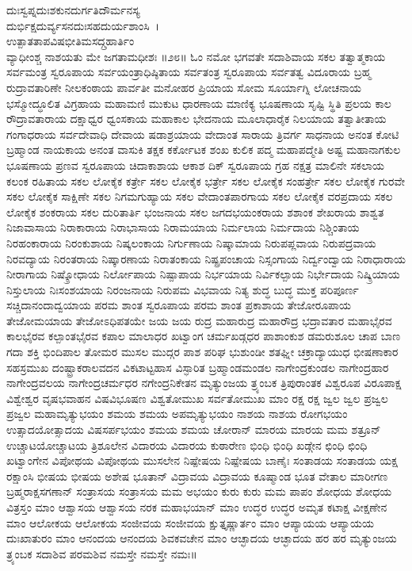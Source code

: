 ದುಃಸ್ವಪ್ನದುಃಶಕುನದುರ್ಗತಿದೌರ್ಮನಸ್ಯ\\ದುರ್ಭಿಕ್ಷದುರ್ವ್ಯಸನದುಃಸಹದುರ್ಯಶಾಂಸಿ~।\\
ಉತ್ಪಾತತಾಪವಿಷಭೀತಿಮಸದ್ಗ್ರಹಾರ್ತಿಂ\\ವ್ಯಾಧೀಂಶ್ಚ ನಾಶಯತು ಮೇ ಜಗತಾಮಧೀಶಃ ॥೨೮॥
\newpage
ಓಂ ನಮೋ ಭಗವತೇ ಸದಾಶಿವಾಯ ಸಕಲ ತತ್ವಾತ್ಮಕಾಯ ಸರ್ವಮಂತ್ರ ಸ್ವರೂಪಾಯ ಸರ್ವಯಂತ್ರಾಧಿಷ್ಠಿತಾಯ ಸರ್ವತಂತ್ರ ಸ್ವರೂಪಾಯ ಸರ್ವತತ್ವ ವಿದೂರಾಯ ಬ್ರಹ್ಮ ರುದ್ರಾವತಾರಿಣೇ ನೀಲಕಂಠಾಯ ಪಾರ್ವತೀ ಮನೋಹರ ಪ್ರಿಯಾಯ ಸೋಮ ಸೂರ್ಯಾಗ್ನಿ ಲೋಚನಾಯ ಭಸ್ಮೋದ್ಧೂಲಿತ ವಿಗ್ರಹಾಯ ಮಹಾಮಣಿ ಮುಕುಟ ಧಾರಣಾಯ ಮಾಣಿಕ್ಯ ಭೂಷಣಾಯ ಸೃಷ್ಟಿ ಸ್ಥಿತಿ ಪ್ರಲಯ ಕಾಲ ರೌದ್ರಾವತಾರಾಯ ದಕ್ಷಾಧ್ವರ ಧ್ವಂಸಕಾಯ ಮಹಾಕಾಲ ಭೇದನಾಯ ಮೂಲಾಧಾರೈಕ ನಿಲಯಾಯ ತತ್ವಾತೀತಾಯ ಗಂಗಾಧರಾಯ ಸರ್ವದೇವಾಧಿ ದೇವಾಯ ಷಡಾಶ್ರಯಾಯ ವೇದಾಂತ ಸಾರಾಯ ತ್ರಿವರ್ಗ ಸಾಧನಾಯ ಅನಂತ ಕೋಟಿ ಬ್ರಹ್ಮಾಂಡ ನಾಯಕಾಯ ಅನಂತ ವಾಸುಕಿ ತಕ್ಷಕ ಕರ್ಕೋಟಕ ಶಂಖ ಕುಲಿಕ ಪದ್ಮ ಮಹಾಪದ್ಮೇತಿ ಅಷ್ಟ ಮಹಾನಾಗಕುಲ ಭೂಷಣಾಯ ಪ್ರಣವ ಸ್ವರೂಪಾಯ ಚಿದಾಕಾಶಾಯ ಆಕಾಶ ದಿಕ್ ಸ್ವರೂಪಾಯ ಗ್ರಹ ನಕ್ಷತ್ರ ಮಾಲಿನೇ ಸಕಲಾಯ ಕಲಂಕ ರಹಿತಾಯ ಸಕಲ ಲೋಕೈಕ ಕರ್ತ್ರೇ ಸಕಲ ಲೋಕೈಕ ಭರ್ತ್ರೇ ಸಕಲ ಲೋಕೈಕ ಸಂಹರ್ತ್ರೇ ಸಕಲ ಲೋಕೈಕ ಗುರವೇ ಸಕಲ ಲೋಕೈಕ ಸಾಕ್ಷಿಣೇ ಸಕಲ ನಿಗಮಗುಹ್ಯಾಯ ಸಕಲ ವೇದಾಂತಪಾರಗಾಯ ಸಕಲ ಲೋಕೈಕ ವರಪ್ರದಾಯ ಸಕಲ ಲೋಕೈಕ ಶಂಕರಾಯ ಸಕಲ ದುರಿತಾರ್ತಿ ಭಂಜನಾಯ ಸಕಲ ಜಗದಭಯಂಕರಾಯ ಶಶಾಂಕ ಶೇಖರಾಯ ಶಾಶ್ವತ ನಿಜಾವಾಸಾಯ ನಿರಾಕಾರಾಯ ನಿರಾಭಾಸಾಯ ನಿರಾಮಯಾಯ ನಿರ್ಮಲಾಯ ನಿರ್ಮದಾಯ ನಿಶ್ಚಿಂತಾಯ ನಿರಹಂಕಾರಾಯ ನಿರಂಕುಶಾಯ ನಿಷ್ಕಲಂಕಾಯ ನಿರ್ಗುಣಾಯ ನಿಷ್ಕಾಮಾಯ ನಿರುಪಪ್ಲವಾಯ ನಿರುಪದ್ರವಾಯ ನಿರವದ್ಯಾಯ ನಿರಂತರಾಯ ನಿಷ್ಕಾರಣಾಯ ನಿರಾತಂಕಾಯ ನಿಷ್ಪ್ರಪಂಚಾಯ ನಿಸ್ಸಂಗಾಯ ನಿರ್ದ್ವಂದ್ವಾಯ ನಿರಾಧಾರಾಯ ನೀರಾಗಾಯ ನಿಷ್ಕ್ರೋಧಾಯ ನಿರ್ಲೋಪಾಯ ನಿಷ್ಪಾಪಾಯ ನಿರ್ಭಯಾಯ ನಿರ್ವಿಕಲ್ಪಾಯ ನಿರ್ಭೇದಾಯ ನಿಷ್ಕ್ರಿಯಾಯ ನಿಸ್ತುಲಾಯ ನಿಃಸಂಶಯಾಯ ನಿರಂಜನಾಯ ನಿರುಪಮ ವಿಭವಾಯ ನಿತ್ಯ ಶುದ್ಧ ಬುದ್ಧ ಮುಕ್ತ ಪರಿಪೂರ್ಣ ಸಚ್ಚಿದಾನಂದಾದ್ವಯಾಯ ಪರಮ ಶಾಂತ ಸ್ವರೂಪಾಯ ಪರಮ ಶಾಂತ ಪ್ರಕಾಶಾಯ ತೇಜೋರೂಪಾಯ ತೇಜೋಮಯಾಯ ತೇಜೋಽಧಿಪತಯೇ ಜಯ ಜಯ ರುದ್ರ ಮಹಾರುದ್ರ ಮಹಾರೌದ್ರ ಭದ್ರಾವತಾರ ಮಹಾಭೈರವ ಕಾಲಭೈರವ ಕಲ್ಪಾಂತಭೈರವ ಕಪಾಲ ಮಾಲಾಧರ ಖಟ್ವಾಂಗ ಚರ್ಮಖಡ್ಗಧರ ಪಾಶಾಂಕುಶ ಡಮರುಶೂಲ ಚಾಪ ಬಾಣ ಗದಾ ಶಕ್ತಿ ಭಿಂದಿಪಾಲ ತೋಮರ ಮುಸಲ ಮುದ್ಗರ ಪಾಶ ಪರಿಘ ಭುಶುಂಡೀ ಶತಘ್ನೀ ಚಕ್ರಾದ್ಯಾಯುಧ ಭೀಷಣಾಕಾರ ಸಹಸ್ರಮುಖ ದಂಷ್ಟ್ರಾಕರಾಲವದನ ವಿಕಟಾಟ್ಟಹಾಸ ವಿಸ್ಫಾರಿತ ಬ್ರಹ್ಮಾಂಡಮಂಡಲ ನಾಗೇಂದ್ರಕುಂಡಲ ನಾಗೇಂದ್ರಹಾರ ನಾಗೇಂದ್ರವಲಯ ನಾಗೇಂದ್ರಚರ್ಮಧರ ನಗೇಂದ್ರನಿಕೇತನ ಮೃತ್ಯುಂಜಯ ತ್ರ್ಯಂಬಕ ತ್ರಿಪುರಾಂತಕ ವಿಶ್ವರೂಪ ವಿರೂಪಾಕ್ಷ ವಿಶ್ವೇಶ್ವರ ವೃಷಭವಾಹನ ವಿಷವಿಭೂಷಣ ವಿಶ್ವತೋಮುಖ ಸರ್ವತೋಮುಖ ಮಾಂ ರಕ್ಷ ರಕ್ಷ ಜ್ವಲ ಜ್ವಲ ಪ್ರಜ್ವಲ ಪ್ರಜ್ವಲ ಮಹಾಮೃತ್ಯುಭಯಂ ಶಮಯ ಶಮಯ ಅಪಮೃತ್ಯುಭಯಂ ನಾಶಯ ನಾಶಯ ರೋಗಭಯಂ ಉತ್ಸಾದಯೋತ್ಸಾದಯ ವಿಷಸರ್ಪಭಯಂ ಶಮಯ ಶಮಯ ಚೋರಾನ್ ಮಾರಯ ಮಾರಯ ಮಮ ಶತ್ರೂನ್ ಉಚ್ಚಾಟಯೋಚ್ಚಾಟಯ ತ್ರಿಶೂಲೇನ ವಿದಾರಯ ವಿದಾರಯ ಕುಠಾರೇಣ ಭಿಂಧಿ ಭಿಂಧಿ ಖಡ್ಗೇನ ಛಿಂಧಿ ಛಿಂಧಿ ಖಟ್ವಾಂಗೇನ ವಿಪೋಥಯ ವಿಪೋಥಯ ಮುಸಲೇನ ನಿಷ್ಪೇಷಯ ನಿಷ್ಪೇಷಯ ಬಾಣೈಃ ಸಂತಾಡಯ ಸಂತಾಡಯ ಯಕ್ಷ ರಕ್ಷಾಂಸಿ ಭೀಷಯ ಭೀಷಯ ಅಶೇಷ ಭೂತಾನ್ ವಿದ್ರಾವಯ ವಿದ್ರಾವಯ ಕೂಷ್ಮಾಂಡ ಭೂತ ವೇತಾಲ ಮಾರೀಗಣ ಬ್ರಹ್ಮರಾಕ್ಷಸಗಣಾನ್ ಸಂತ್ರಾಸಯ ಸಂತ್ರಾಸಯ ಮಮ ಅಭಯಂ ಕುರು ಕುರು ಮಮ ಪಾಪಂ ಶೋಧಯ ಶೋಧಯ ವಿತ್ರಸ್ತಂ ಮಾಂ ಆಶ್ವಾಸಯ ಆಶ್ವಾಸಯ ನರಕ ಮಹಾಭಯಾನ್ ಮಾಂ ಉದ್ಧರ ಉದ್ಧರ ಅಮೃತ ಕಟಾಕ್ಷ ವೀಕ್ಷಣೇನ ಮಾಂ ಆಲೋಕಯ ಆಲೋಕಯ ಸಂಜೀವಯ ಸಂಜೀವಯ ಕ್ಷುತ್ತೃಷ್ಣಾರ್ತಂ ಮಾಂ ಆಪ್ಯಾಯಯ ಆಪ್ಯಾಯಯ ದುಃಖಾತುರಂ ಮಾಂ ಆನಂದಯ ಆನಂದಯ ಶಿವಕವಚೇನ ಮಾಂ ಆಚ್ಛಾದಯ ಆಚ್ಛಾದಯ ಹರ ಹರ ಮೃತ್ಯುಂಜಯ ತ್ರ್ಯಂಬಕ ಸದಾಶಿವ ಪರಮಶಿವ ನಮಸ್ತೇ ನಮಸ್ತೇ ನಮಃ॥
